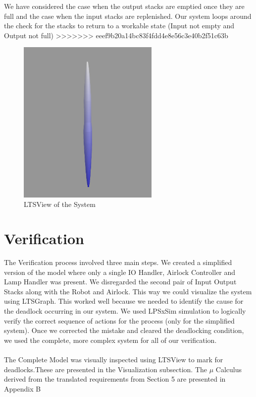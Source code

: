 \documentclass[a4paper,12pt]{article}
\begin{document}
	We have considered the case when the output stacks are emptied once they are full and the case when the input stacks are replenished. Our system loops around the check for the stacks to return to a workable state (Input not empty and Output not full)
>>>>>>> eeef9b20a14bc83f4fdd4e8e56c3e40b2f51c63b
	\begin{figure}[ht]
		\centering
		\includegraphics[width=\textwidth, height=8cm]{3D-Model.png}
		\caption{LTSView of the System}
		\label{fig:ltsview}
	\end{figure}
	\newpage
	\section{Verification}
	The Verification process involved three main steps. We created a simplified version of the model where only a single IO Handler, Airlock Controller and Lamp Handler was present. We disregarded the second pair of Input Output Stacks along with the Robot and Airlock. This way we could visualize the system using LTSGraph. This worked well because we needed to identify the cause for the deadlock occurring in our system. We used LPSxSim simulation to logically verify the correct sequence of actions for the process (only for the simplified system). Once we corrected the mistake and cleared the deadlocking condition, we used the complete, more complex system for all of our verification.
	\\
	\\The Complete Model was visually inspected using LTSView to mark for deadlocks.These are presented in the Visualization subsection. The $\mu$ Calculus derived from the translated requirements from Section 5 are presented in Appendix B 
\end{document}
